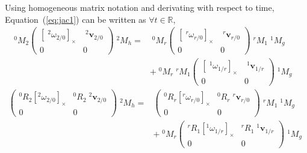 \documentclass{article}
\newcommand\linvel{\mathbf{v}}
\newcommand\trans{\mathbf{t}}
\newcommand\reals{\mathbb{R}}
\begin{document}
Using homogeneous matrix notation and derivating with respect to time, Equation~(\ref{eq:jac1}) can be written as $\forall t\in\reals$,
\begin{align}\label{eq:jac2}
  ^0M_2
  \left(\begin{array}{ll}[\;^2\omega_{2/0}]_{\times} & \;^2\linvel_{2/0} \\ 0&0\end{array}\right)\;^2M_h =&
    \;^0M_r\left(\begin{array}{ll}[\;^r\omega_{r/0}]_{\times} & \;^r\linvel_{r/0} \\ 0&0\end{array}\right) \;^rM_1\;^1M_g \\
    & + \;^0M_r \;^rM_1\left(\begin{array}{ll}[\;^1\omega_{1/r}]_{\times} & \;^1\linvel_{1/r} \\ 0&0\end{array}\right)\;^1M_g &
\end{align}
\begin{align*}
  \left(\begin{array}{ll}^0R_2[^2\omega_{2/0}]_{\times} & ^0R_2\;^2\linvel_{2/0} \\ 0&0\end{array}\right)\;^2M_h =&
    \left(\begin{array}{ll}^0R_r[^r\omega_{r/0}]_{\times} & ^0R_r\;^r\linvel_{r/0} \\ 0&0\end{array}\right) \;^rM_1\;^1M_g \\
    & + \;^0M_r \left(\begin{array}{ll}^rR_1[^1\omega_{1/r}]_{\times} & ^rR_1\;^1\linvel_{1/r} \\ 0&0\end{array}\right)\;^1M_g &
\end{align*}
\end{document}
